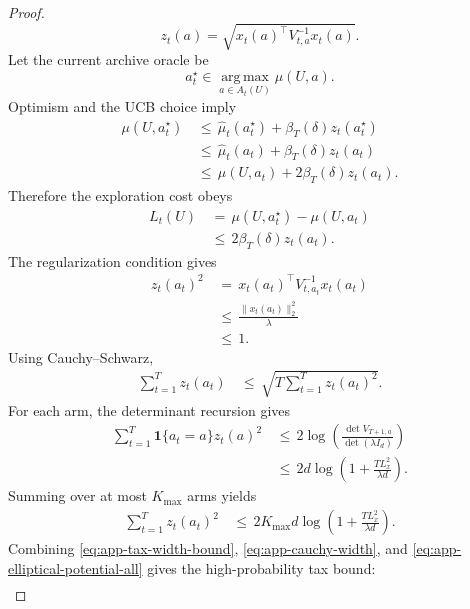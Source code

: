 \documentclass{article} %
\begin{document}
\begin{proof}
\begin{equation}
\label{eq:app-width}
z_t(a)
=
\sqrt{x_t(a)^\top V_{t,a}^{-1}x_t(a)}.
\end{equation}
Let the current archive oracle be
\begin{equation}
\label{eq:app-current-oracle-arm}
a_t^\star
\in
\operatorname*{arg\,max}_{a\in A_t(U)}\mu(U,a).
\end{equation}
Optimism and the UCB choice imply
\begin{align}
\label{eq:app-optimism-chain}
\mu(U,a_t^\star)
&\,\le\,
\widehat{\mu}_t(a_t^\star)
+
\beta_T(\delta)z_t(a_t^\star)
\\
&\,\le\,
\widehat{\mu}_t(a_t)
+
\beta_T(\delta)z_t(a_t)
\\
&\,\le\,
\mu(U,a_t)
+
2\beta_T(\delta)z_t(a_t).
\end{align}
Therefore the exploration cost obeys
\begin{align}
\label{eq:app-tax-width-bound}
L_t(U)
&\,=\,
\mu(U,a_t^\star)-\mu(U,a_t)
\\
&\,\le\,
2\beta_T(\delta)z_t(a_t).
\end{align}
The regularization condition gives
\begin{align}
\label{eq:app-width-at-most-one}
z_t(a_t)^2
&\,=\,
x_t(a_t)^\top V_{t,a_t}^{-1}x_t(a_t)
\\
&\,\le\,
\frac{\|x_t(a_t)\|_2^2}{\lambda}
\\
&\,\le\,
1.
\end{align}
Using Cauchy--Schwarz,
\begin{align}
\label{eq:app-cauchy-width}
\sum_{t=1}^{T}z_t(a_t)
&\,\le\,
\sqrt{
T
\sum_{t=1}^{T}z_t(a_t)^2
}.
\end{align}
For each arm, the determinant recursion gives
\begin{align}
\label{eq:app-elliptical-potential-arm}
\sum_{t=1}^{T}
\mathbf{1}\{a_t=a\}z_t(a)^2
&\,\le\,
2
\log\!\left(
\frac{\det V_{T+1,a}}{\det(\lambda I_d)}
\right)
\\
&\,\le\,
2d
\log\!\left(1+\frac{T L_x^2}{\lambda d}\right).
\end{align}
Summing over at most \(K_{\max}\) arms yields
\begin{align}
\label{eq:app-elliptical-potential-all}
\sum_{t=1}^{T}z_t(a_t)^2
&\,\le\,
2K_{\max}d
\log\!\left(1+\frac{T L_x^2}{\lambda d}\right).
\end{align}
Combining \eqref{eq:app-tax-width-bound}, \eqref{eq:app-cauchy-width}, and \eqref{eq:app-elliptical-potential-all} gives the high-probability tax bound:
\begin{align}

\end{align}
\end{proof}
\end{document}
